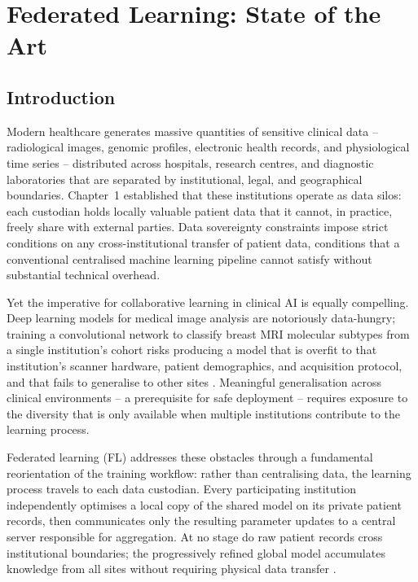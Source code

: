 \chapter{Federated Learning: State of the Art}
\label{chap:fl-state-of-the-art}

\section{Introduction}
\label{sec:ch2-intro}

Modern healthcare generates massive quantities of sensitive clinical
data -- radiological images, genomic profiles, electronic health records,
and physiological time series -- distributed across hospitals, research
centres, and diagnostic laboratories that are separated by
institutional, legal, and geographical boundaries.
Chapter~1 established that these institutions operate as data silos:
each custodian holds locally valuable patient data that it cannot, in
practice, freely share with external parties.
Data sovereignty constraints impose strict conditions on any cross-institutional
transfer of patient data, conditions that a conventional centralised machine
learning pipeline cannot satisfy without substantial technical overhead.

Yet the imperative for collaborative learning in clinical AI is equally
compelling.
Deep learning models for medical image analysis are notoriously
data-hungry; training a convolutional network to classify breast MRI
molecular subtypes from a single institution's cohort risks producing a
model that is overfit to that institution's scanner hardware, patient
demographics, and acquisition protocol, and that fails to generalise to
other sites \cite{rieke2020future}.
Meaningful generalisation across clinical environments -- a prerequisite
for safe deployment -- requires exposure to the diversity that is only
available when multiple institutions contribute to the learning process.

Federated learning (FL) addresses these obstacles through a fundamental
reorientation of the training workflow: rather than centralising data,
the learning process travels to each data custodian.
Every participating institution independently optimises a local copy of
the shared model on its private patient records, then communicates only
the resulting parameter updates to a central server responsible for
aggregation.
At no stage do raw patient records cross institutional boundaries; the
progressively refined global model accumulates knowledge from all sites
without requiring physical data transfer
\cite{mcmahan2017communication,kairouz2021advances}.

